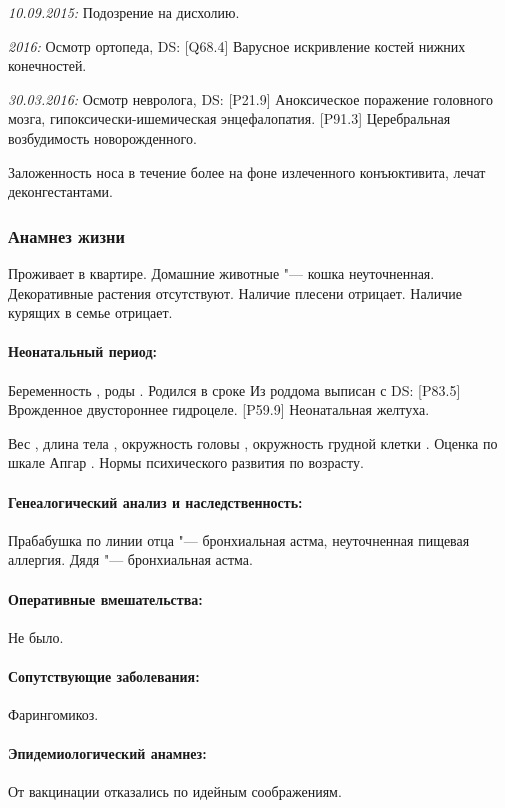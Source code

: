 \documentclass[a4paper,14pt]{extarticle}
\newcommand{\gramm}{г}
\newcommand{\cm}{см}
\newcommand{\weeks}{нед.}
\newcommand{\pdate}[1]{\emph{#1:} }
\newcommand{\DS}[2]{[#2] #1}
\begin{document}
\pdate{10.09.2015} Подозрение на дисхолию.

\pdate{2016} Осмотр ортопеда, DS: \DS{Варусное искривление костей нижних конечностей}{Q68.4}.

\pdate{30.03.2016} Осмотр невролога, DS: \DS{Аноксическое поражение головного мозга, гипоксически-ишемическая энцефалопатия}{P21.9}. \DS{Церебральная возбудимость новорожденного}{P91.3}.

Заложенность носа в течение более  на фоне излеченного конъюктивита, лечат деконгестантами.

\subsubsection*{Анамнез жизни}

Проживает в квартире. Домашние животные "--- кошка неуточненная. Декоративные растения отсутствуют. Наличие плесени отрицает. Наличие курящих в семье отрицает.

\paragraph{Неонатальный период:} Беременность , роды . Родился в сроке \numprint[\weeks]{41} Из роддома выписан с DS: \DS{Врожденное двустороннее гидроцеле}{P83.5}. \DS{Неонатальная желтуха}{P59.9}.

Вес \numprint[\gramm]{4630}, длина тела \numprint[\cm]{57}, окружность головы \numprint[\cm]{36}, окружность грудной клетки \numprint[\cm]{37}. Оценка по шкале Апгар . Нормы психического развития по возрасту.

\paragraph{Генеалогический анализ и наследственность:} Прабабушка по линии отца "--- бронхиальная астма, неуточненная пищевая аллергия. Дядя "--- бронхиальная астма.

\paragraph{Оперативные вмешательства:} Не было.

\paragraph{Сопутствующие заболевания:} Фарингомикоз.

\paragraph{Эпидемиологический анамнез:} От вакцинации отказались по идейным соображениям.
\end{document}
